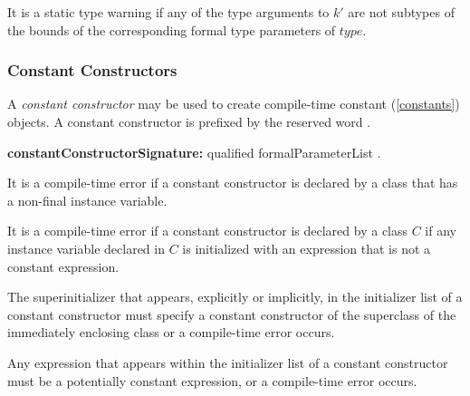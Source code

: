 \documentclass{article}
\begin{document}
\LMHash{}
It is a static type warning if any of the type arguments to $k'$ are not subtypes of the bounds of the corresponding formal type parameters of $type$.


\subsubsection{Constant Constructors}

\LMHash{}
A {\em constant constructor} may be used to create compile-time constant (\ref{constants}) objects.
A constant constructor is prefixed by the reserved word \CONST{}.

\begin{grammar}
{\bf constantConstructorSignature:}\CONST{} qualified formalParameterList
  .
\end{grammar}



\LMHash{}
It is a compile-time error if a constant constructor is declared by a class that has a non-final instance variable.


\LMHash{}
It is a compile-time error if a constant constructor is declared by a class $C$ if any instance variable declared in $C$ is initialized with an expression that is not a constant expression.


\LMHash{}
The superinitializer that appears, explicitly or implicitly, in the initializer list of a constant constructor must specify a constant constructor of the superclass of the immediately enclosing class or a compile-time error occurs.

\LMHash{}
Any expression that appears within the initializer list of a constant constructor must be a potentially constant expression, or a compile-time error occurs.
\end{document}
